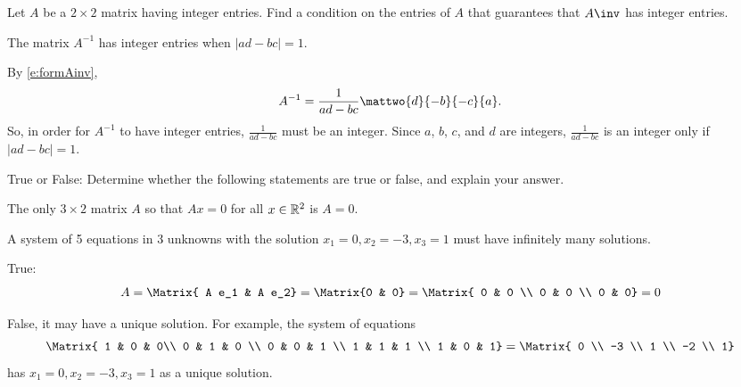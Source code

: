 \documentclass{article}
\begin{document}



\problemlabel

\begin{exercise} \label{c4.9.5}
Let $A$ be a $2\times 2$ matrix having integer entries.  Find a
condition on the entries of $A$ that guarantees that $A\inv$ has
integer entries.

\begin{solution}

\ans The matrix $A^{-1}$ has integer entries when $|ad - bc| = 1$.

\soln By \eqref{e:formAinv},
\[
A^{-1} = \frac{1}{ad-bc}\mattwo{d}{-b}{-c}{a}.
\]
So, in order for $A^{-1}$ to have integer entries, $\frac{1}{ad-bc}$
must be an integer.  Since $a$, $b$, $c$, and $d$ are integers,
$\frac{1}{ad - bc}$ is an integer only if $|ad - bc| = 1$.


\end{solution}
\end{exercise}





\problemlabel

\begin{exercise} \label{A3.7.2}
True or False: Determine whether the following statements are true or false, and explain your answer.
\begin{enumeratea}
\item The only $3\times 2$ matrix $A$ so that $Ax = 0 $ for all $x \in \mathbb R^2$ is $A=0$.

\item A system of 5 equations in 3 unknowns with the solution $x_1=0, x_2=-3,x_3=1$ must have infinitely many solutions.

\end{enumeratea}

\begin{solution}
\begin{enumeratea}
\item True:
\[
A=\Matrix{ A e_1 & A e_2}=\Matrix{0 & 0}=\Matrix{ 0 & 0 \\ 0 & 0 \\ 0 & 0}=0
\]
\item False, it may have a unique solution. For example, the system of equations
\[
\Matrix{ 1 & 0 & 0\\ 0 & 1 & 0 \\ 0 & 0 & 1 \\ 1 & 1 & 1 \\ 1 & 0 & 1} = \Matrix{ 0 \\ -3 \\ 1 \\ -2 \\ 1}
\]
has $x_1=0, x_2=-3,x_3=1$ as a unique solution.
\end{enumeratea}
\end{solution}

\end{exercise}


\end{document}
